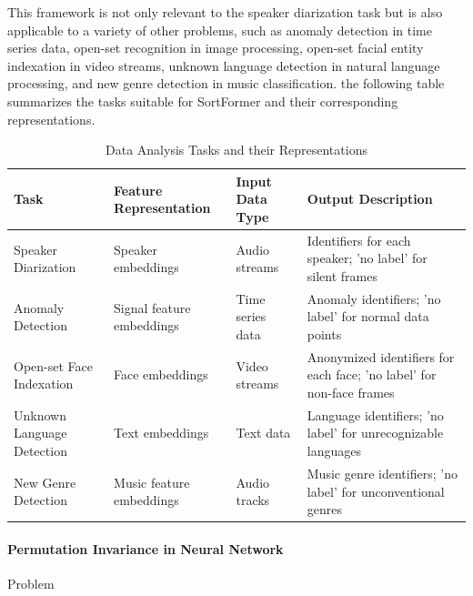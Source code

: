 \documentclass{article}
\begin{document}
This framework is not only relevant to the speaker diarization task but is also applicable to a variety of other problems, such as
anomaly detection in time series data,
open-set recognition in image processing,
open-set facial entity indexation in video streams,
unknown language detection in natural language processing,
and new genre detection in music classification.
the following table summarizes the tasks suitable for SortFormer and their corresponding representations.

\begin{table}[h]
  \centering
  \renewcommand{\arraystretch}{1.5} %
  \begin{tabularx}{\textwidth}{p{3cm}|p{3cm}|p{2.5cm}|p{3cm}}
    \toprule
    \textbf{Task}              & \textbf{Feature Representation} & \textbf{Input Data Type} & \textbf{Output Description}                                          \\
    \hline
    Speaker Diarization        & Speaker embeddings              & Audio streams            & Identifiers for each speaker; 'no label' for silent frames           \\
    \hline
    Anomaly Detection          & Signal feature embeddings       & Time series data         & Anomaly identifiers; 'no label' for normal data points               \\
    \hline
    Open-set Face Indexation   & Face embeddings               & Video streams            & Anonymized identifiers for each face; 'no label' for non-face frames \\
    \hline
    Unknown Language Detection & Text embeddings                 & Text data                & Language identifiers; 'no label' for unrecognizable languages        \\
    \hline
    New Genre Detection        & Music feature embeddings        & Audio tracks             & Music genre identifiers; 'no label' for unconventional genres        \\
    \bottomrule
  \end{tabularx}
  \vspace{1.5px}
  \caption{Data Analysis Tasks and their Representations}
  \label{tab:tasks}
\end{table}

\paragraph{Permutation Invariance in Neural Network}
Problem
\end{document}
